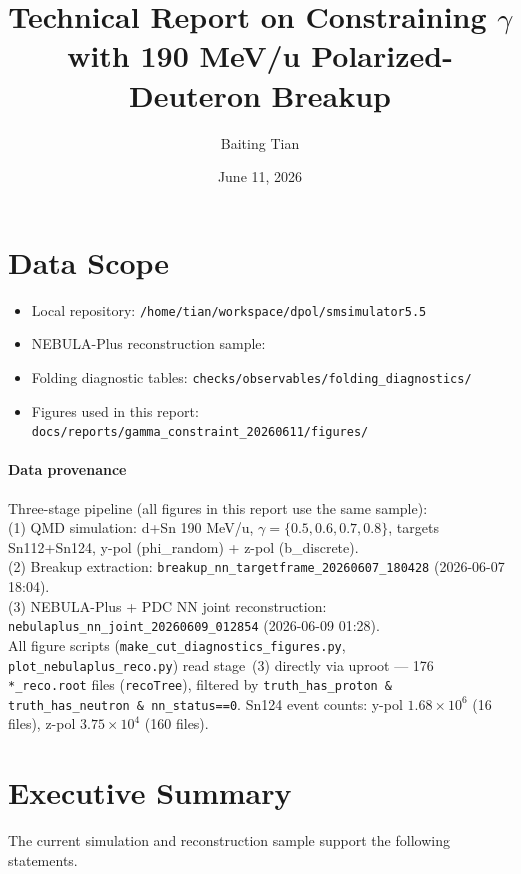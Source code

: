 \documentclass[a4paper,11pt]{article}
\title{\textbf{Technical Report on Constraining $\gamma$ with 190 MeV/u Polarized-Deuteron Breakup}}
\author{Baiting Tian}
\date{June 11, 2026}
\begin{document}
\maketitle

\section*{Data Scope}

\begin{itemize}
  \item Local repository: \texttt{/home/tian/workspace/dpol/smsimulator5.5}
  \item NEBULA-Plus reconstruction sample: {\footnotesize{}}
  \item Folding diagnostic tables: \texttt{checks/observables/folding\_diagnostics/}
  \item Figures used in this report: \texttt{docs/reports/gamma\_constraint\_20260611/figures/}
\end{itemize}

\paragraph{Data provenance}
Three-stage pipeline (all figures in this report use the same sample): \\
(1) QMD simulation: d+Sn 190 MeV/u, $\gamma=\{0.5,0.6,0.7,0.8\}$, targets Sn112+Sn124, y-pol (phi\_random) + z-pol (b\_discrete). \\
(2) Breakup extraction: \texttt{breakup\_nn\_targetframe\_20260607\_180428} (2026-06-07 18:04). \\
(3) NEBULA-Plus + PDC NN joint reconstruction: \texttt{nebulaplus\_nn\_joint\_20260609\_012854} (2026-06-09 01:28). \\
All figure scripts (\texttt{make\_cut\_diagnostics\_figures.py}, \texttt{plot\_nebulaplus\_reco.py}) read stage~(3) directly via uproot --- 176 \texttt{*\_reco.root} files (\texttt{recoTree}), filtered by \texttt{truth\_has\_proton \& truth\_has\_neutron \& nn\_status==0}. Sn124 event counts: y-pol $1.68\times10^6$ (16 files), z-pol $3.75\times10^4$ (160 files).

\section*{Executive Summary}

The current simulation and reconstruction sample support the following statements.
\end{document}

